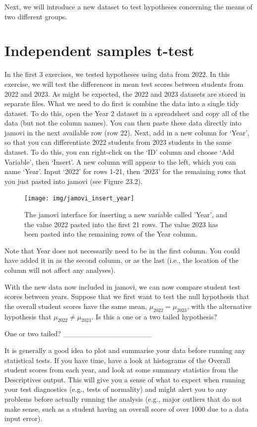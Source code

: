 \documentclass[
  openany]{krantz}
\begin{document}
Next, we will introduce a new dataset to test hypotheses concerning the means of two different groups.

\hypertarget{independent-samples-t-test-1}{%
\section{Independent samples t-test}\label{independent-samples-t-test-1}}

In the first 3 exercises, we tested hypotheses using data from 2022.
In this exercise, we will test the differences in mean test scores between students from 2022 and 2023.
As might be expected, the 2022 and 2023 datasets are stored in separate files.
What we need to do first is combine the data into a single tidy dataset.
To do this, open the Year 2 dataset in a spreadsheet and copy all of the data (but not the column names).
You can then paste these data directly into jamovi in the next available row (row 22).
Next, add in a new column for `Year', so that you can differentiate 2022 students from 2023 students in the same dataset.
To do this, you can right-click on the `ID' column and choose `Add Variable', then `Insert'.
A new column will appear to the left, which you can name `Year'.
Input `2022' for rows 1-21, then `2023' for the remaining rows that you just pasted into jamovi (see Figure 23.2).

\begin{figure}
\texttt{[image: img/jamovi\_insert\_year]} \caption{The jamovi interface for inserting a new variable called 'Year', and the value 2022 pasted into the first 21 rows. The value 2023 has been pasted into the remaining rows of the Year column.}\label{fig:unnamed-chunk-90}
\end{figure}

Note that Year does not necessarily need to be in the first column.
You could have added it in as the second column, or as the last (i.e., the location of the column will not affect any analyses).

With the new data now included in jamovi, we can now compare student test scores between years.
Suppose that we first want to test the null hypothesis that the overall student scores have the same mean, \(\mu_{2022} = \mu_{2023}\), with the alternative hypothesis that \(\mu_{2022} \neq \mu_{2023}\).
Is this a one or a two tailed hypothesis?

One or two tailed? \_\_\_\_\_\_\_\_\_\_\_\_\_\_\_\_\_

It is generally a good idea to plot and summarise your data before running any statistical tests.
If you have time, have a look at histograms of the Overall student scores from each year, and look at some summary statistics from the Descriptives output.
This will give you a sense of what to expect when running your test diagnostics (e.g., tests of normality) and might alert you to any problems before actually running the analysis (e.g., major outliers that do not make sense, such as a student having an overall score of over 1000 due to a data input error).
\end{document}
